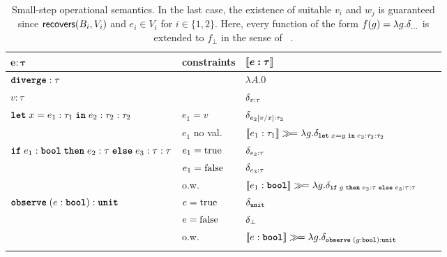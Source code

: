 
\begin{table}[t]
	\allowdisplaybreaks
	\caption{Small-step operational semantics. In the last case, the existence of suitable $v_i$ and $w_j$ is guaranteed since $\distinguishes{B_i}{V_i}$ and $e_i\in V_i$ for $i \in \{1,2\}$. Here, every function of the form $f(g) = \lambda g. \dirac{\ldots}$ is extended to $f_{\bot}$ in the sense of ~.}
	\label{tab:smallstep-1}%
	\begin{center}
		\begin{adjustbox}{width=\textwidth}
		\begin{tabular}{l l l l l}
			\toprule
			\toprule
			$\mathbf{e \boldsymbol{:} \boldsymbol{\tau}}$ & \textbf{constraints}  & $\boldsymbol{\llbracket e : \tau \rrbracket}$   \\
			\hline
			
			& & $\lambda A.0$  \\
			\midrule
			
			& & $\delta_{v:\tau}$ \\
			\midrule
			
			& $e_1=v$ & $\delta_{e_2[v/x] : \tau_2}$ \\
			& $e_1$ no val.\ & $\llbracket  e_1 : \tau_1  \rrbracket \gg\!=  \lambda g. \delta_{ \textnormal{\ttfamily\bfseries let} \; x = g \; \textnormal{\ttfamily\bfseries in} \; e_2 : \tau_2 : \tau_2} $ \\
			\midrule 
			
			& $e_1=\textnormal{true}$ & $\delta_{e_2 : \tau} $ \\
			& $e_1=\textnormal{false}$ & $\delta_{e_3 : \tau} $ \\
			& o.w.\ & $\llbracket  e_1 : \textnormal{\ttfamily\bfseries bool} \rrbracket \gg\!= \lambda g. \delta_{ \textnormal{\ttfamily\bfseries if} \; g \; \textnormal{\ttfamily\bfseries then} \; e_2 : \tau \; \textnormal{\ttfamily\bfseries else} \; e_3 : \tau : \tau} $ \\
			\midrule 
			
			& $e = \textnormal{true}$ & $\delta_{\textnormal{\ttfamily\bfseries unit}}$ \\
			& $e=\textnormal{false}$ & $\delta_{\bot}$ \\
			& o.w.\ & $\llbracket e: \textnormal{\ttfamily\bfseries bool} \rrbracket \gg\!= \lambda g. \delta_{\textnormal{\ttfamily\bfseries observe}\; (g : \textnormal{\ttfamily\bfseries bool})  : \textnormal{\ttfamily\bfseries unit}}$ \\
			\midrule
			 

\end{tabular}
\end{adjustbox}
\end{center}
\end{table}
